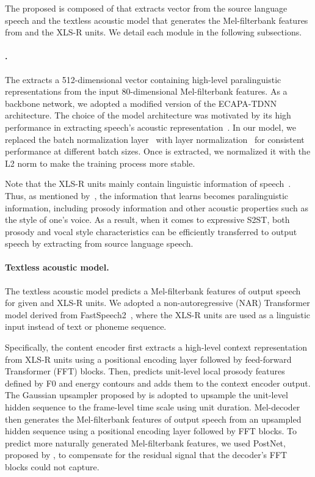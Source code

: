 The proposed \ptv is composed of \ptvenc that extracts \ptvemb vector from the source language speech and the textless acoustic model that generates the Mel-filterbank features from \ptvemb and the XLS-R units.
We detail each module in the following subsections.

\paragraph{\ptvenchead.}
\label{sec:p2v_enc}
The \ptvenc extracts a 512-dimensional \ptvemb vector containing high-level paralinguistic representations from the input 80-dimensional Mel-filterbank features.
As a backbone network, we adopted a modified version of the ECAPA-TDNN architecture. The choice of the model architecture was motivated by its high performance in extracting speech's acoustic representation~\citep{desplanques-ecapa-tdnn-2020}.
In our model, we replaced the batch normalization layer~\citep{ioffe2015batch} with layer normalization~\citep{lei2016layer} for consistent performance at different batch sizes.
Once \ptvemb is extracted, we normalized it with the L2 norm to make the training process more stable.

Note that the XLS-R units mainly contain linguistic information of speech~\citep{SeamlessM4TArXiv}.
Thus, as mentioned by~\citet{skerry2018towards}, the information that \ptvemb learns becomes paralinguistic information, including prosody information and other acoustic properties such as the style of one's voice.
As a result, when it comes to expressive S2ST, both prosody and vocal style characteristics can be efficiently transferred to output speech by extracting \ptvemb from source language speech.


\paragraph{Textless acoustic model.}
\label{sec:p2v_am}
The textless acoustic model predicts a Mel-filterbank features of output speech for given \ptvemb and XLS-R units.
We adopted a non-autoregressive (NAR) Transformer model derived from FastSpeech2~\citep{ren2021fastspeech2}, where the XLS-R units are used as a linguistic input instead of text or phoneme sequence. %

Specifically, the content encoder first extracts a high-level context representation from XLS-R units using a positional encoding layer followed by feed-forward Transformer (FFT) blocks. 
Then, \ptvenc predicts unit-level local prosody features defined by F0 and energy contours and adds them to the context encoder output.
The Gaussian upsampler proposed by \citet{shen2020nonattentive} is adopted to upsample the unit-level hidden sequence to the frame-level time scale using unit duration.
Mel-decoder then generates the Mel-filterbank features of output speech from an upsampled hidden sequence using a positional encoding layer followed by FFT blocks.
To predict more naturally generated Mel-filterbank features, we used PostNet, proposed by \citet{jonathan2017natural}, to compensate for the residual signal that the decoder's FFT blocks could not capture.

